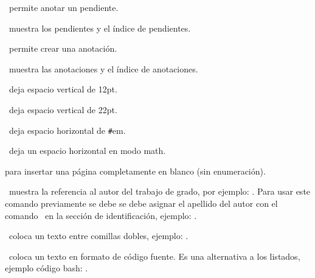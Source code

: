

\pa\ permite anotar un pendiente.

\ muestra los pendientes y el índice de pendientes.


\pa\ permite crear una anotación.

\ muestra las anotaciones y el índice de anotaciones.


\ deja espacio vertical de 12pt.

\ deja espacio vertical de 22pt.

\pa[\#]\ deja espacio horizontal de \texttt{\#}em.

\ deja un espacio horizontal en modo math.

 para insertar una página completamente en blanco (sin enumeración).


\ muestra la referencia al autor del trabajo de grado, por ejemplo: \yo. Para usar este comando previamente se debe
se debe asignar el apellido del autor con el comando \ en la sección de identificación, ejemplo: .

\ coloca un texto entre comillas dobles, ejemplo: .

\ coloca un texto en formato de código fuente. Es una alternativa a los listados, ejemplo código bash: .
